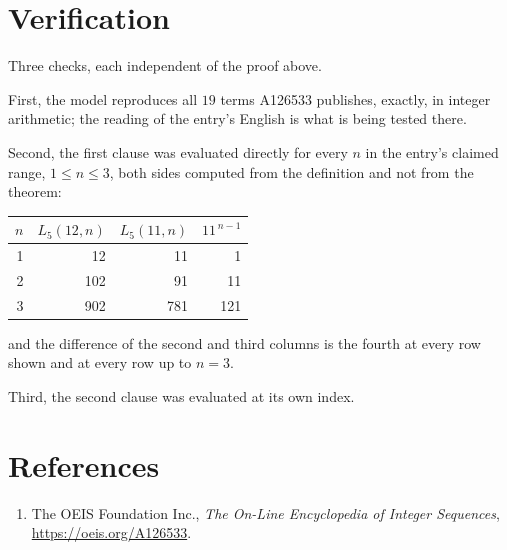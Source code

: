 \documentclass[11pt,a4paper]{article}
\theoremstyle{plain}
\theoremstyle{definition}
\begin{document}
\section{Verification}

Three checks, each independent of the proof above.

First, the model reproduces all $19$ terms A126533 publishes, exactly, in integer
arithmetic; the reading of the entry's English is what is being tested there.

Second, the first clause was evaluated directly for every $n$ in the entry's claimed range,
$1\le n\le3$, both sides computed from the definition and not from the theorem:

\begin{center}
\begin{tabular}{rrrr}
$n$ & $L_{5}(12,n)$ & $L_{5}(11,n)$ & $11^{\,n-1}$ \\ \hline
1 & 12 & 11 & 1 \\
2 & 102 & 91 & 11 \\
3 & 902 & 781 & 121 \\
\end{tabular}
\end{center}

\noindent and the difference of the second and third columns is the fourth at every row shown
and at every row up to $n=3$.

Third, the second clause was evaluated at its own index.

\section*{References}
\begin{enumerate}
\item The OEIS Foundation Inc., \emph{The On-Line Encyclopedia of Integer Sequences},
\url{https://oeis.org/A126533}.
\end{enumerate}
\end{document}
